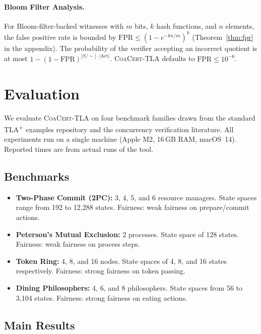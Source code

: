 \documentclass[11pt]{article}
\newcommand{\Act}{\ensuremath{\mathrm{Act}}}
\newcommand{\CoaCert}{\textsc{CoaCert-TLA}}
\newcommand{\TLAplus}{TLA\textsuperscript{+}}
\newcommand{\FPR}{\ensuremath{\mathrm{FPR}}}
\begin{document}
\paragraph{Bloom Filter Analysis.}
For Bloom-filter-backed witnesses with $m$ bits, $k$ hash functions,
and $n$ elements, the false positive rate is bounded by
$\FPR \leq (1 - e^{-kn/m})^k$ (Theorem~\ref{thm:fpr} in the appendix).
The probability of the verifier accepting an incorrect quotient is at
most $1 - (1 - \FPR)^{|S/{\sim}| \cdot |\Act|}$.
\CoaCert{} defaults to $\FPR \leq 10^{-6}$.

\section{Evaluation}
\label{sec:evaluation}

We evaluate \CoaCert{} on four benchmark families drawn from the standard
\TLAplus{} examples repository and the concurrency verification literature.
All experiments run on a single machine (Apple M2, 16\,GB RAM, macOS~14).
Reported times are from actual runs of the tool.

\subsection{Benchmarks}

\begin{itemize}[nosep]
\item \textbf{Two-Phase Commit (2PC):} 3, 4, 5, and 6 resource managers.
  State spaces range from 192 to 12{,}288 states.
  Fairness: weak fairness on prepare/commit actions.

\item \textbf{Peterson's Mutual Exclusion:} 2 processes.
  State space of 128 states.
  Fairness: weak fairness on process steps.

\item \textbf{Token Ring:} 4, 8, and 16 nodes.
  State spaces of 4, 8, and 16 states respectively.
  Fairness: strong fairness on token passing.

\item \textbf{Dining Philosophers:} 4, 6, and 8 philosophers.
  State spaces from 56 to 3{,}104 states.
  Fairness: strong fairness on eating actions.
\end{itemize}

\subsection{Main Results}
\end{document}
